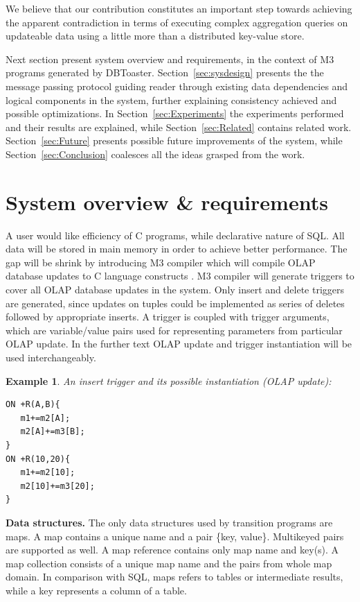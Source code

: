 \documentclass{sig-semester}
\newtheorem{example}[theorem]{Example}
\def\SQL{SQL\xspace}
\def\OLAP{OLAP\xspace}
\def\M3{M3\xspace}
\begin{document}
We believe that our contribution constitutes an important step towards achieving the apparent contradiction in terms of executing complex aggregation queries on updateable data using a little more than a distributed key-value store.

Next section present system overview and requirements, in the context of \M3 programs generated by DBToaster. Section~\ref{sec:sysdesign} presents the the message passing protocol guiding reader through existing data dependencies and logical components in the system, further explaining consistency achieved and possible optimizations. In Section~\ref{sec:Experiments} the experiments performed and their results are explained, while Section~\ref{sec:Related} contains related work. Section~\ref{sec:Future} presents possible future improvements of the system, while Section~\ref{sec:Conclusion} coalesces all the ideas grasped from the work.

\section{System overview \& requirements}
\vspace{2mm}

A user would like efficiency of C programs, while declarative nature of \SQL. All data will be stored in main memory in order to achieve better performance. The gap will be shrink by introducing \M3 compiler which will compile \OLAP database updates to C language constructs \cite{DBToasterCompiler09}. \M3 compiler will generate triggers to cover all \OLAP database updates in the system. Only insert and delete triggers are generated, since updates on tuples could be implemented as series of deletes followed by appropriate inserts. A trigger is coupled with trigger arguments, which are variable/value pairs used for representing parameters from particular \OLAP update. In the further text \OLAP update and trigger instantiation will be used interchangeably.

\begin{example} \em
\label{ex:simpleTrigger}
An insert trigger and its possible instantiation (\OLAP update):
\begin{verbatim}
ON +R(A,B){
   m1+=m2[A];
   m2[A]+=m3[B];
}
ON +R(10,20){
   m1+=m2[10];
   m2[10]+=m3[20];
} 
\end{verbatim}
\end{example}

\textbf{Data structures.} The only data structures used by transition programs are maps. A map contains a unique name and a pair \{key, value\}. Multikeyed pairs are supported as well. A map reference contains only map name and key(s). A map collection consists of a unique map name and the pairs from whole map domain. In comparison with SQL, maps refers to tables or intermediate results, while a key represents a column of a table.
\end{document}
